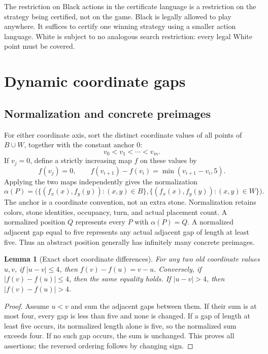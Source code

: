 \documentclass[11pt]{article}
\newtheorem{lemma}[theorem]{Lemma}
\theoremstyle{definition}
\theoremstyle{remark}
\newcommand{\A}{\alpha}
\begin{document}
The restriction on Black actions in the certificate language is a
restriction on the strategy being certified, not on the game. Black is
legally allowed to play anywhere. It suffices to certify one winning
strategy using a smaller action language. White is subject to no analogous
search restriction: every legal White point must be covered.

\section{Dynamic coordinate gaps}
\label{sec:gaps}
\subsection{Normalization and concrete preimages}
For either coordinate axis, sort the distinct coordinate values of all
points of $B\cup W$, together with the constant anchor $0$:
\[
 v_0< v_1<\cdots<v_m.
\]
If $v_j=0$, define a strictly increasing map $f$ on these values by
\[
 f(v_j)=0,\qquad f(v_{i+1})-f(v_i)=\min(v_{i+1}-v_i,5).
\]
Applying the two maps independently gives the normalization
\[
 \A(P)=\bigl(\{(f_x(x),f_y(y)):(x,y)\in B\},
             \{(f_x(x),f_y(y)):(x,y)\in W\}\bigr).
\]
The anchor is a coordinate convention, not an extra stone. Normalization
retains colors, stone identities, occupancy, turn, and actual placement
count. A normalized position $Q$ represents every $P$ with $\A(P)=Q$.
A normalized adjacent gap equal to five represents any actual adjacent gap
of length at least five. Thus an abstract position generally has infinitely
many concrete preimages.

\begin{lemma}[Exact short coordinate differences]
\label{lem:short}
For any two old coordinate values $u,v$, if $|u-v|\leq4$, then
$f(v)-f(u)=v-u$. Conversely, if $|f(v)-f(u)|\leq4$, then the same equality
holds. If $|u-v|>4$, then $|f(v)-f(u)|>4$.
\end{lemma}
\begin{proof}
Assume $u<v$ and sum the adjacent gaps between them. If their sum is at
most four, every gap is less than five and none is changed. If a gap of
length at least five occurs, its normalized length alone is five, so the
normalized sum exceeds four. If no such gap occurs, the sum is unchanged.
This proves all assertions; the reversed ordering follows by changing
sign.
\end{proof}
\end{document}
